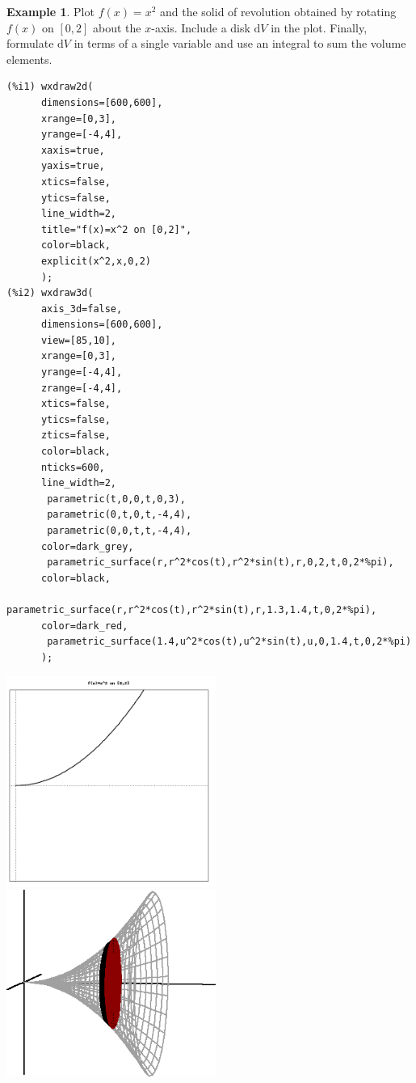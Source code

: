 \documentclass[10.5pt,twoside]{report}
\theoremstyle{definition}
\newtheorem{exmp}{Example}[section]
\begin{document}
\begin{exmp} Plot $f(x)=x^2$ and the solid of revolution obtained by rotating $f(x)$ on $[0,2]$ about the $x$-axis.  Include a disk $\mathrm{d}V$ in the plot.  Finally, formulate $\mathrm{d}V$ in terms of a single variable and use an integral to sum the volume elements.\\


\begin{verbatim}
(%i1) wxdraw2d(
      dimensions=[600,600],
      xrange=[0,3],
      yrange=[-4,4],
      xaxis=true,
      yaxis=true,
      xtics=false,
      ytics=false,
      line_width=2,
      title="f(x)=x^2 on [0,2]",
      color=black,
      explicit(x^2,x,0,2)
      );
(%i2) wxdraw3d(  
      axis_3d=false,
      dimensions=[600,600],
      view=[85,10],
      xrange=[0,3],
      yrange=[-4,4],
      zrange=[-4,4],
      xtics=false,
      ytics=false,
      ztics=false,
      color=black,
      nticks=600,
      line_width=2,
       parametric(t,0,0,t,0,3),
       parametric(0,t,0,t,-4,4),
       parametric(0,0,t,t,-4,4),
      color=dark_grey,
       parametric_surface(r,r^2*cos(t),r^2*sin(t),r,0,2,t,0,2*%pi),
      color=black,
       parametric_surface(r,r^2*cos(t),r^2*sin(t),r,1.3,1.4,t,0,2*%pi),
      color=dark_red,
       parametric_surface(1.4,u^2*cos(t),u^2*sin(t),u,0,1.4,t,0,2*%pi)
      );
\end{verbatim}

\includegraphics[width=2.7in]{example_3_2_1_1}
\includegraphics[width=2.7in]{example_3_2_1_2}



\end{exmp}
\end{document}
